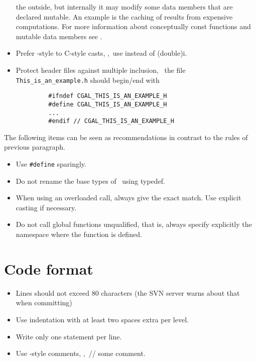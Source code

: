 \begin{itemize}
      the outside, but internally it may modify some data members
      that are declared {\ccFont mutable}. An example
      is the caching of results from expensive computations.  For more
      information about conceptually {\ccFont const} functions and mutable data
      members see \cite{cgal:m-ec-97}.
\item Prefer \CC-style to C-style casts,%
      \eg,~use  instead of {\ccFont (double)i}.
\item Protect header files against multiple inclusion,
      \eg~the file {\tt This\_is\_an\_example.h} should begin/end with
      \begin{verbatim}
         #ifndef CGAL_THIS_IS_AN_EXAMPLE_H
         #define CGAL_THIS_IS_AN_EXAMPLE_H
         ...
         #endif // CGAL_THIS_IS_AN_EXAMPLE_H
     \end{verbatim}
\end{itemize}

The following items can be seen as recommendations
in contrast to the rules of previous paragraph.

\begin{itemize}
\item Use \verb|#define| sparingly.
\item Do not rename the base types of \CC\ using {\ccFont typedef}.
\item When using an overloaded call, always give the exact match. Use
  explicit casting if necessary.
\item Do not call global functions unqualified, that is, always
  specify explicitly the namespace where the function is defined.
\end{itemize}


\section{Code format\label{sec:code_format}}

\begin{itemize}
\item Lines should not exceed 80 characters (the SVN server warns about that
      when committing)%
\item Use indentation with at least two spaces extra per level.%
\item Write only one statement per line.
\item Use \CC-style comments, \eg,~{\ccFont // some comment}.%
\end{itemize}


